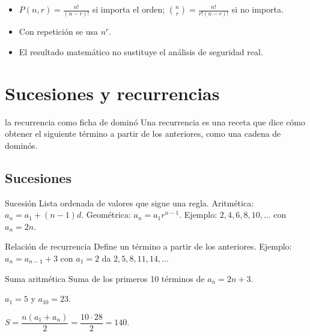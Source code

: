 \begin{tmresumen}
\begin{itemize}
\item $P(n, r)=\frac{n!}{(n-r)!}$ si importa el orden; $\binom nr=\frac{n!}{r!(n-r)!}$ si no importa.
\item Con repetici\'on se usa $n^r$.
\item El resultado matem\'atico no sustituye el an\'alisis de seguridad real.
\end{itemize}
\end{tmresumen}

\section{Sucesiones y recurrencias}
\label{sec:2-3}

\begin{tmconcepto}{la recurrencia como ficha de domin\'o}
Una recurrencia es una receta que dice c\'omo obtener el siguiente t\'ermino a partir de los anteriores, como una cadena de domin\'os.
\end{tmconcepto}


\subsection{Sucesiones}
\begin{tmdef}{Sucesi\'on}
Lista ordenada de valores que sigue una regla. Aritm\'etica: $a_n=a_1+(n-1)d$. Geom\'etrica: $a_n=a_1r^{n-1}$. Ejemplo: $2, 4, 6, 8, 10,\dots$ con $a_n=2n$.
\end{tmdef}

\begin{tmdef}{Relaci\'on de recurrencia}
Define un t\'ermino a partir de los anteriores. Ejemplo: $a_n=a_{n-1}+3$ con $a_1=2$ da $2, 5, 8, 11, 14,\dots$
\end{tmdef}

\begin{tmejemplo}{Suma aritm\'etica}
Suma de los primeros 10 t\'erminos de $a_n=2n+3$.
\begin{tmpasos}
\item $a_1=5$ y $a_{10}=23$.
\item $S=\dfrac{n(a_1+a_n)}{2}=\dfrac{10\cdot28}{2}=140$.
\end{tmpasos}
\end{tmejemplo}

